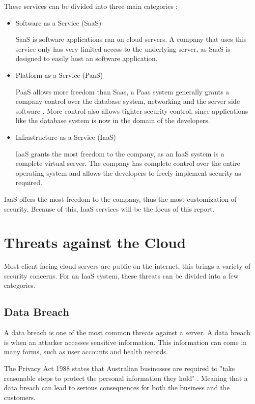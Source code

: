 These services can be divided into three main categories \cite{ibm_ibm_2016}:
\begin{itemize}
    \item Software as a Service (SaaS)
    
    SaaS is software applications ran on cloud servers. A company that uses this service only has very limited access to the underlying server, as SaaS is designed to easily host an software application.

    \item Platform as a Service (PaaS)

    PaaS allows more freedom than Saas, a Paas system generally grants a company control over the database system, networking and the server side software \cite{Interoute_what_2016}. More control also allows tighter security control, since applications like the database system is now in the domain of the developers.

    \item Infrastructure as a Service (IaaS)

    IaaS grants the most freedom to the company, as an IaaS system is a complete virtual server. The company has complete control over the entire operating system and allows the developers to freely implement security as required.
\end{itemize}

IaaS offers the most freedom to the company, thus the most customization of security. Because of this, IaaS services will be the focus of this report.

\section{Threats against the Cloud}

Most client facing cloud servers are public on the internet, this brings a variety of security concerns. For an IaaS system, these threats can be divided into a few categories.

\subsection{Data Breach}

A data breach is one of the most common threats against a server. A data breach is when an attacker accesses sensitive information. This information can come in many forms, such as user accounts and health records. 

The Privacy Act 1988 states that Australian businesses are required to "take reasonable steps to protect the personal information they hold" \cite{office_of_the_australia_information_commissioner_rights_2016}. Meaning that a data breach can lead to serious consequences for both the business and the customers.

